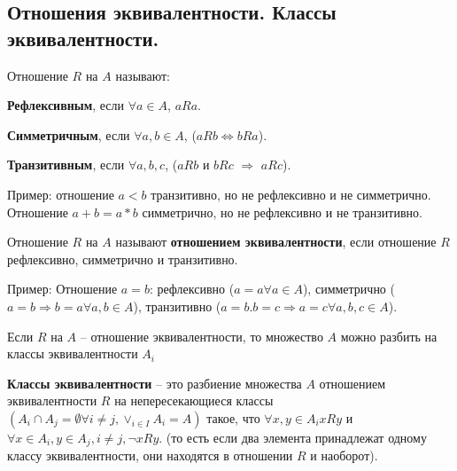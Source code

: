 \subsection{Отношения эквивалентности. Классы эквивалентности.}

   Отношение $R$ на $A$ называют:

   \textbf{Рефлексивным}, если $\forall a \in A$, $aRa$.

   \textbf{Симметричным}, если $\forall a, b \in A$, ($aRb \Leftrightarrow bRa$).

   \textbf{Транзитивным}, если $\forall a, b, c$, ($aRb$ и $bRc$ $\Rightarrow$ $aRc$).

   Пример: отношение $a < b$ транзитивно, но не рефлексивно и не симметрично. Отношение $a + b = a * b$ симметрично, но не рефлексивно и не транзитивно.

   Отношение $R$ на $A$ называют \textbf{отношением эквивалентности}, если отношение $R$ рефлексивно, симметрично и транзитивно.

    Пример: Отношение $a = b$: рефлексивно ($a = a \forall a \in A$), симметрично ($a = b \Rightarrow b = a \forall a, b \in A$), транзитивно ($a = b. b = c \Rightarrow a = c \forall a, b, c \in A$).

     Если $R$ на $A$ -- отношение эквивалентности, то множество $A$ можно разбить на классы эквивалентности $A_i$

     \textbf{Классы эквивалентности} -- это разбиение множества $A$ отношением эквивалентности $R$ на непересекающиеся классы $(A_i \cap A_j = \emptyset \forall i \neq j, \vee_{i \in I} A_i = A)$ такое, что $\forall x, y \in A_i xRy$ и $\forall x \in A_i, y \in A_j, i \neq j, \neg xRy$. (то есть если два элемента принадлежат одному классу эквивалентности, они находятся в отношении $R$ и наоборот).
